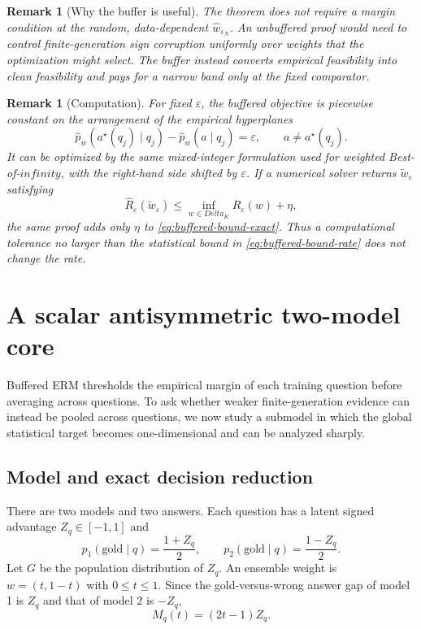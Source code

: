 \documentclass[11pt]{article}
\def\infty{infinity}%
\def\Delta{Delta}%
\newtheorem{remark}[theorem]{Remark}
\newcommand{\eps}{\varepsilon}
\begin{document}
\begin{remark}[Why the buffer is useful]
The theorem does not require a margin condition at the random, data-dependent $\widehat w_{\eps_N}$.  An unbuffered proof would need to control finite-generation sign corruption uniformly over weights that the optimization might select.  The buffer instead converts empirical feasibility into clean feasibility and pays for a narrow band only at the fixed comparator.
\end{remark}

\begin{remark}[Computation]
For fixed $\eps$, the buffered objective is piecewise constant on the arrangement of the empirical hyperplanes
\[
\widehat p_w(a^\star(q_j)\mid q_j)
-\widehat p_w(a\mid q_j)
=\eps,
\qquad a\ne a^\star(q_j).
\]
It can be optimized by the same mixed-integer formulation used for weighted Best-of-$\infty$, with the right-hand side shifted by $\eps$.  If a numerical solver returns $\widetilde w_\eps$ satisfying
\[
\widehat R_\eps(\widetilde w_\eps)
\le
\inf_{w\in\Delta_K}\widehat R_\eps(w)+\eta,
\]
the same proof adds only $\eta$ to \eqref{eq:buffered-bound-exact}.  Thus a computational tolerance no larger than the statistical bound in \eqref{eq:buffered-bound-rate} does not change the rate.
\end{remark}

\section{A scalar antisymmetric two-model core}
\label{sec:scalar-model}

Buffered ERM thresholds the empirical margin of each training question before averaging across questions.  To ask whether weaker finite-generation evidence can instead be pooled across questions, we now study a submodel in which the global statistical target becomes one-dimensional and can be analyzed sharply.

\subsection{Model and exact decision reduction}

There are two models and two answers.  Each question has a latent signed advantage $Z_q\in[-1,1]$ and
\begin{equation}
\label{eq:antisymmetric}
p_1(\mathrm{gold}\mid q)=\frac{1+Z_q}{2},
\qquad
p_2(\mathrm{gold}\mid q)=\frac{1-Z_q}{2}.
\end{equation}
Let $G$ be the population distribution of $Z_q$.  An ensemble weight is $w=(t,1-t)$ with $0\le t\le1$.  Since the gold-versus-wrong answer gap of model 1 is $Z_q$ and that of model 2 is $-Z_q$,
\begin{equation}
\label{eq:scalar-margin}
M_q(t)=(2t-1)Z_q.
\end{equation}
\end{document}
